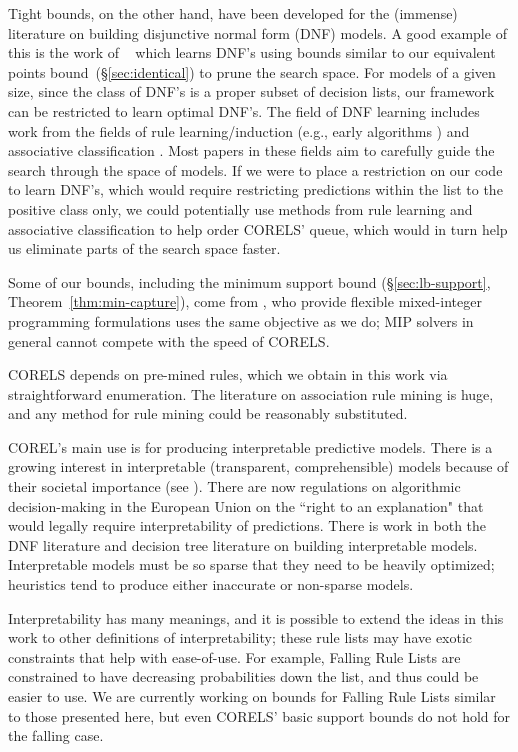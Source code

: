 Tight bounds, on the other hand, have been developed for the (immense) literature on building disjunctive normal form (DNF) models. A good example of this is the work of ~\citet{Rijnbeek10} which learns DNF's using bounds similar to our equivalent points bound~(\S\ref{sec:identical}) to prune the search space.  For models of a given size, since the class of DNF's is a proper subset of decision lists, our framework can be restricted to learn optimal DNF's. The field of DNF learning includes work from the fields of rule learning/induction (e.g., early algorithms \citep{Michalski1969,ClarkNiblett1989,Frank1998}) and associative classification \citep{Vanhoof10}. Most papers in these fields aim to carefully guide the search through the space of models. If we were to place a restriction on our code to learn DNF's, which would require restricting predictions within the list to the positive class only, we could potentially use methods from rule learning and associative classification to help order CORELS' queue, which would in turn help us eliminate parts of the search space faster. 

Some of our bounds, including the minimum support bound (\S\ref{sec:lb-support}, Theorem~\ref{thm:min-capture}), come from \citep{RudinEr15}, who provide flexible mixed-integer programming formulations uses the same objective as we do; MIP solvers in general cannot compete with the speed of CORELS.

CORELS depends on pre-mined rules, which we obtain in this work via straightforward enumeration.
The literature on association rule mining is huge, and any method for rule mining could be reasonably substituted.

COREL's main use is for producing interpretable predictive models. There is a growing interest in interpretable (transparent, comprehensible) models because of their societal importance (see \citep{ruping2006learning,bratko1997machine,dawes1979robust,VellidoEtAl12,Giraud98,Holte93,Schmueli10,Huysmans11,Freitas14}). There are now regulations on algorithmic decision-making in the European Union on the ``right to an explanation" \citep{Goodman2016EU} that would legally require interpretability of predictions. There is work in both the DNF literature \citep{Ruckert2008} and decision tree literature \cite{GarofalakisHyRaSh00} on building interpretable models. Interpretable models must be so sparse that they need to be heavily optimized; heuristics tend to produce either inaccurate or non-sparse models.

Interpretability has many meanings, and it is possible to extend the ideas in this work to other definitions of interpretability; these rule lists may have exotic constraints that help with ease-of-use. For example, Falling Rule Lists \citep{WangRu15} are constrained to have decreasing probabilities down the list, and thus could be easier to use. We are currently working on bounds for Falling Rule Lists \citep{ChenRu17} similar to those presented here, but even CORELS' basic support bounds do not hold for the falling case. 

